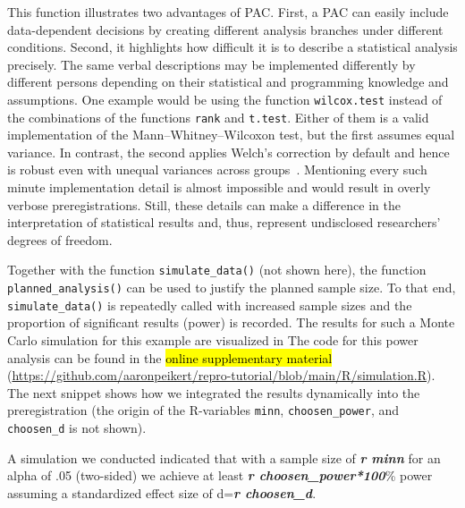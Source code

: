 \documentclass[psych,tutorial,accept,moreauthors,pdftex]{Definitions/mdpi}
\newenvironment{Shaded}{\begin{snugshade}}{\end{snugshade}}
\newcommand{\InformationTok}[1]{\textcolor[rgb]{0.56,0.35,0.01}{\textbf{\textit{#1}}}}
\newcommand{\NormalTok}[1]{#1}
\begin{document}
\begin{paracol}{2}
\switchcolumn


This function illustrates two advantages of PAC. First, a PAC can easily
include data-dependent decisions by creating different analysis branches
under different conditions. Second, it highlights how difficult it is to
describe a statistical analysis precisely. The same verbal descriptions
may be implemented differently by different persons depending on their
statistical and programming knowledge and assumptions. One example would
be using the function \texttt{wilcox.test} instead of the combinations
of the functions \texttt{rank} and \texttt{t.test}. Either of them is a
valid implementation of the Mann--Whitney--Wilcoxon test, but the first
assumes equal variance. In contrast, the second applies Welch's
correction by default and hence is robust even with unequal variances
across groups~\citep{zimmermanRankTransformationsPower1993}. Mentioning
every such minute implementation detail is almost impossible and would
result in overly verbose preregistrations. Still, these details can make
a difference in the interpretation of statistical results and, thus,
represent undisclosed researchers' degrees of freedom.

Together with the function \texttt{simulate\_data()} (not shown here),
the function \texttt{planned\_\linebreak analysis()} can be used to justify the
planned sample size. To that end, \texttt{simulate\_data()} is
repeatedly called with increased sample sizes and the proportion of
significant results (power) is recorded. The results for such a Monte
Carlo simulation for this example are visualized in  %
 The code
for this power analysis can be found in the \hl{online supplementary material}
(\url{https://github.com/aaronpeikert/repro-tutorial/blob/main/R/simulation.R}). The next snippet shows how we integrated the
results dynamically into the preregistration (the origin of the
R-variables \texttt{minn}, \texttt{choosen\_power}, and
\texttt{choosen\_d} is not shown).




\vspace{+6pt}
\end{paracol}
\nointerlineskip
\begin{adjustwidth}{0.5cm}{0cm} 
\begin{Shaded}
\begin{Highlighting}[]
\NormalTok{A simulation we conducted indicated that with a sample size of }\InformationTok{\textasciigrave{}r minn\textasciigrave{}}\NormalTok{ for}
\NormalTok{an alpha of .05 (two{-}sided) we achieve at least }\InformationTok{\textasciigrave{}r choosen\_power*100\textasciigrave{}}\NormalTok{\% power}
\NormalTok{assuming a standardized effect size of d=}\InformationTok{\textasciigrave{}r choosen\_d\textasciigrave{}}\NormalTok{.}
\end{Highlighting}
\end{Shaded}
\end{adjustwidth}
\end{document}
